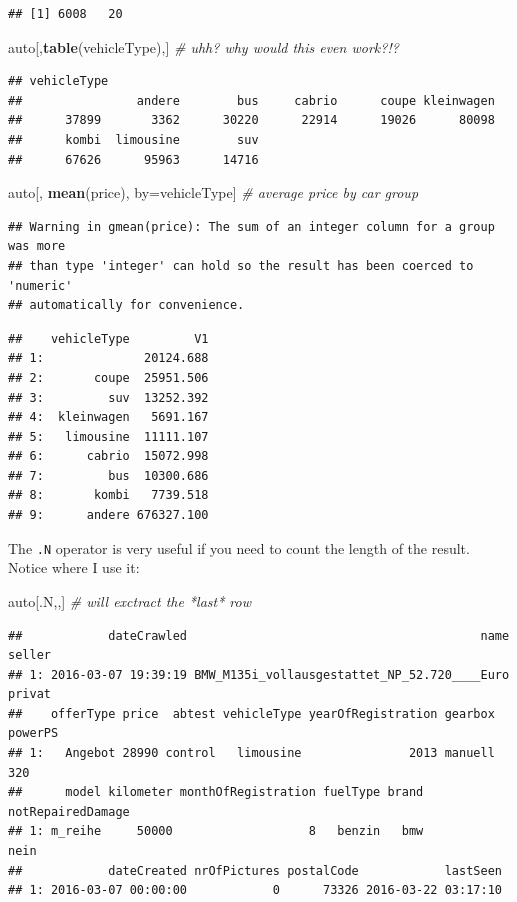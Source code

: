 \documentclass[]{book}
\newenvironment{Shaded}{\begin{snugshade}}{\end{snugshade}}
\newcommand{\CommentTok}[1]{\textcolor[rgb]{0.56,0.35,0.01}{\textit{#1}}}
\newcommand{\KeywordTok}[1]{\textcolor[rgb]{0.13,0.29,0.53}{\textbf{#1}}}
\newcommand{\NormalTok}[1]{#1}
\theoremstyle{definition}
\theoremstyle{definition}
\theoremstyle{definition}
\theoremstyle{remark}
\begin{document}
\begin{verbatim}
## [1] 6008   20
\end{verbatim}

\begin{Shaded}
\begin{Highlighting}[]
\NormalTok{auto[,}\KeywordTok{table}\NormalTok{(vehicleType),] }\CommentTok{# uhh? why would this even work?!?}
\end{Highlighting}
\end{Shaded}

\begin{verbatim}
## vehicleType
##                andere        bus     cabrio      coupe kleinwagen 
##      37899       3362      30220      22914      19026      80098 
##      kombi  limousine        suv 
##      67626      95963      14716
\end{verbatim}

\begin{Shaded}
\begin{Highlighting}[]
\NormalTok{auto[, }\KeywordTok{mean}\NormalTok{(price), by=vehicleType] }\CommentTok{# average price by car group}
\end{Highlighting}
\end{Shaded}

\begin{verbatim}
## Warning in gmean(price): The sum of an integer column for a group was more
## than type 'integer' can hold so the result has been coerced to 'numeric'
## automatically for convenience.
\end{verbatim}

\begin{verbatim}
##    vehicleType         V1
## 1:              20124.688
## 2:       coupe  25951.506
## 3:         suv  13252.392
## 4:  kleinwagen   5691.167
## 5:   limousine  11111.107
## 6:      cabrio  15072.998
## 7:         bus  10300.686
## 8:       kombi   7739.518
## 9:      andere 676327.100
\end{verbatim}

The \texttt{.N} operator is very useful if you need to count the length of the result.
Notice where I use it:

\begin{Shaded}
\begin{Highlighting}[]
\NormalTok{auto[.N,,] }\CommentTok{# will exctract the *last* row}
\end{Highlighting}
\end{Shaded}

\begin{verbatim}
##            dateCrawled                                         name seller
## 1: 2016-03-07 19:39:19 BMW_M135i_vollausgestattet_NP_52.720____Euro privat
##    offerType price  abtest vehicleType yearOfRegistration gearbox powerPS
## 1:   Angebot 28990 control   limousine               2013 manuell     320
##      model kilometer monthOfRegistration fuelType brand notRepairedDamage
## 1: m_reihe     50000                   8   benzin   bmw              nein
##            dateCreated nrOfPictures postalCode            lastSeen
## 1: 2016-03-07 00:00:00            0      73326 2016-03-22 03:17:10
\end{verbatim}
\end{document}
